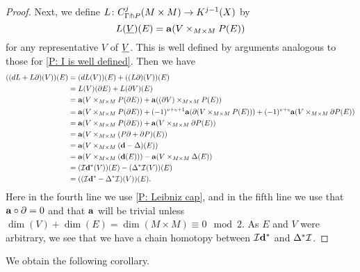 \begin{proof}
	Next, we define $L \colon C^j_{\Gamma \pitchfork P}(M \times M) \to K^{j-1}(X)$ by $$L(\underline{V})(E) = \mathbf{a}(V \times_{M \times M} P(E))$$
	for any representative $V$ of $\underline{V}$.
	This is well defined by arguments analogous to those for \cref{P: I is well defined}.
	Then we have
	\begin{align*}
		((dL + L\partial)(V))(E) &=(dL(V))(E) + ((L\partial)(V))(E) \\
			& = L(V)(\partial E) +L(\partial V)(E)\\
			& = \mathbf{a}(V \times_{M \times M} P(\partial E)) + \mathbf{a}((\partial V) \times_{M \times M} P(E))\\
			& = \mathbf{a}(V \times_{M \times M} P(\partial E)) + (-1)^{v+e+1}\mathbf{a}(\partial(V \times_{M \times M} P(E)))+(-1)^{v+e}\mathbf{a}(V \times_{M \times M} \partial P(E))\\
			&=\mathbf{a}(V \times_{M \times M} P(\partial E)) +\mathbf{a}(V \times_{M \times M} \partial P(E))\\
			&=\mathbf{a}(V \times_{M \times M} (P\partial + \partial P)(E))\\
			&=\mathbf{a}(V \times_{M \times M} (\mathbf{d} - \Delta)(E))\\
			&=\mathbf{a}(V \times_{M \times M} (\mathbf{d}(E))) - \mathbf{a}(V \times_{M \times M} \Delta(E))\\
			&=(\mathcal{I} \mathbf{d}^*(V))(E)- 	(\Delta^*\mathcal{I}(V))(E)\\
			&=((\mathcal{I} \mathbf{d}^*- \Delta^*\mathcal{I})(V))(E).
	\end{align*}
	Here in the fourth line we use \cref{P: Leibniz cap}, and in the fifth line we use that $\mathbf{a} \circ \partial =0$ and that $\mathbf{a}$ will be trivial unless $\dim(V)+ \dim(E) = \dim(M \times M) \equiv 0 \mod 2$.
	As $E$ and $V$ were arbitrary, we see that we have a chain homotopy between $\mathcal{I} \mathbf{d}^*$ and $\Delta^*\mathcal{I}$.
\end{proof}

We obtain the following corollary.


